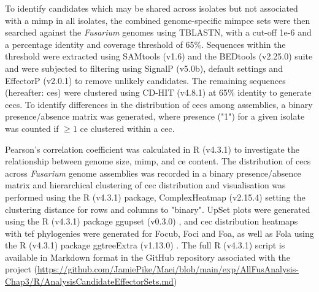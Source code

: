 To identify candidates which may be shared across isolates but not associated with a \ac{mimp} in all isolates, the combined genome-specific \ac{mimpce} sets were then searched against the \textit{Fusarium} genomes using TBLASTN, with a cut-off 1e-6 and a percentage identity and coverage threshold of 65\%. Sequences within the threshold were extracted using SAMtools (v1.6) and the BEDtools (v2.25.0) suite and were subjected to filtering using SignalP (v5.0b), default settings and EffectorP (v2.0.1) to remove unlikely candidates. The remaining sequences (hereafter: \acfp{ce}) were clustered using CD-HIT (v4.8.1) \parencite{Fu2012} at 65\% identity to generate \acp{cec}. To identify differences in the distribution of \acp{cec} among assemblies, a binary presence/absence matrix was generated, where presence ("1") for a given isolate was counted if $\geq1 $ \ac{ce} clustered within a \ac{cec}.

Pearson’s correlation coefficient was calculated in R (v4.3.1) \parencite{R} to investigate the relationship between genome size, \ac{mimp}, and \ac{ce} content. The distribution of \acp{cec} across \textit{Fusarium} genome assemblies was recorded in a binary presence/absence matrix and hierarchical clustering of \ac{cec} distribution and visualisation was performed using the R (v4.3.1) \parencite{R} package, ComplexHeatmap (v2.15.4)  \parencite{ComplexHeatmap} setting the clustering distance for rows and columns to "binary". UpSet plots were generated using the R (v4.3.1) \parencite{R} package ggupset (v0.3.0) \parencite{ggupset}, and \ac{cec} distribution heatmaps with \ac{tef} phylogenies were generated for \ac{Focub}, \ac{Foci} and \ac{Foa}, as well as \ac{Fola} using the R (v4.3.1) \parencite{R} package ggtreeExtra (v1.13.0) \parencite{ggtree}. The full R (v4.3.1) script is available in Markdown format in the GitHub repository associated with the project (\href{https://github.com/JamiePike/Maei/blob/main/exp/AllFusAnalysis-Chap3/R/AnalysisCandidateEffectorSets.md}{https://github.com/JamiePike/Maei/blob/mai\-n/exp/AllFusAnalysis-Chap3/R/AnalysisCandidateEffectorSets.md}) 


